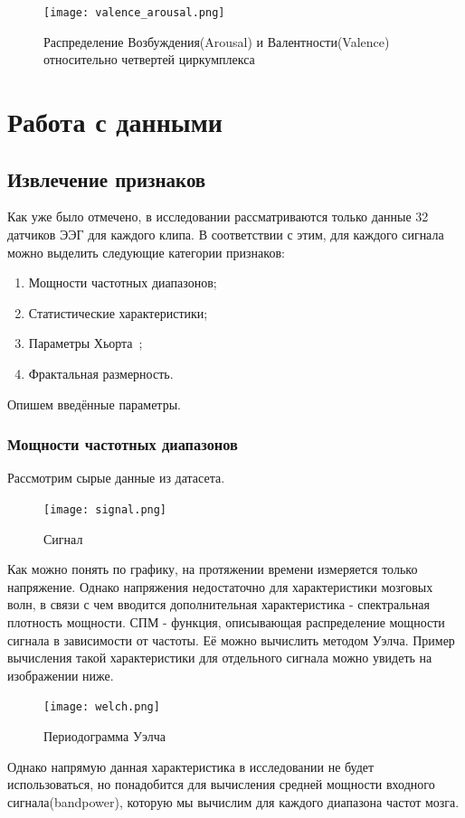 \documentclass{article}
\begin{document}
\begin{figure}[h]
\centering
\texttt{[image: valence\_arousal.png]}
\caption{Распределение Возбуждения(Arousal) и Валентности(Valence) относительно четвертей циркумплекса}
\end{figure}

\section{Работа с данными}
\subsection{Извлечение признаков}
Как уже было отмечено, в исследовании рассматриваются только данные 32 датчиков ЭЭГ для каждого клипа. В соответствии с этим, для каждого сигнала можно выделить следующие категории признаков:
\begin{enumerate}
    \item Мощности частотных диапазонов;
    \item Статистические характеристики;
    \item Параметры Хьорта~\cite{Hjorth};
    \item Фрактальная размерность.
\end{enumerate}
Опишем введённые параметры.
\subsubsection{Мощности частотных диапазонов}
Рассмотрим сырые данные из датасета.

\begin{figure}[h]
\centering
\texttt{[image: signal.png]}
\caption{Сигнал}
\end{figure}

Как можно понять по графику, на протяжении времени измеряется только напряжение. Однако напряжения недостаточно для характеристики мозговых волн, в связи с чем вводится дополнительная характеристика - спектральная плотность мощности. СПМ - функция, описывающая распределение мощности сигнала в зависимости от частоты. Её можно вычислить методом Уэлча\cite{Welch}.
Пример вычисления такой характеристики для отдельного сигнала можно увидеть на изображении ниже.

\begin{figure}[h]
\centering
\texttt{[image: welch.png]}
\caption{Периодограмма Уэлча}
\end{figure}

Однако напрямую данная характеристика в исследовании не будет использоваться, но понадобится для вычисления средней мощности входного сигнала(bandpower), которую мы вычислим для каждого диапазона частот мозга.
\end{document}
